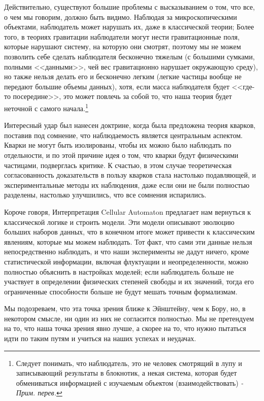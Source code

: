 \documentclass[main.tex]{subfiles}
\begin{document}
Действительно, существуют большие проблемы с высказыванием о том, что все, о чем мы говорим, должно быть видимо. Наблюдая за микроскопическими объектами, наблюдатель может нарушать их, даже в классической теории; Более того, в теориях гравитации наблюдатели могут нести гравитационные поля, которые нарушают систему, на которую они смотрят, поэтому мы не можем позволить себе сделать наблюдателя бесконечно тяжелым (с большими сумками, полными <<данными>>, чей вес гравитационно нарушает окружающую среду), но также нельзя делать его и бесконечно легким (легкие частицы вообще не передают большие объемы данных), хотя, если масса наблюдателя будет <<где-то посередине>>, это может повлечь за собой то, что наша теория будет неточной с самого начала.\footnote{Следует понимать, что наблюдатель, это не человек смотрящий в лупу и записывающий результаты в блокнотик, а некая система, которая будет обмениваться информацией с изучаемым объектом (взаимодействовать)\textit{ - Прим. перев.}}

Интересный удар был нанесен доктрине, когда была предложена теория кварков, поставив под сомнение, что наблюдаемость является центральным аспектом. Кварки не могут быть изолированы, чтобы их можно было наблюдать по отдельности, и по этой причине идея о том, что кварки будут физическими частицами, подверглась критике. К счастью, в этом случае теоретическая согласованность доказательств в пользу кварков стала настолько подавляющей, и экспериментальные методы их наблюдения, даже если они не были полностью разделены, настолько улучшились, что все сомнения испарились.

Короче говоря, Интерпретация Cellular Automaton предлагает нам вернуться к классической логике и строить модели. Эти модели описывают эволюцию больших наборов данных, что в конечном итоге может привести к классическим явлениям, которые мы можем наблюдать. Тот факт, что сами эти данные нельзя непосредственно наблюдать, и что наши эксперименты не дадут ничего, кроме статистической информации, включая флуктуации и неопределенности, можно полностью объяснить в настройках моделей; если наблюдатель больше не участвует в определении физических степеней свободы и их значений, тогда его ограниченные способности больше не будут мешать точным формализмам.

Мы подозреваем, что эта точка зрения ближе к Эйнштейну, чем к Бору, но, в некотором смысле, ни один из них не согласится полностью. Мы не претендуем на то, что наша точка зрения явно лучше, а скорее на то, что нужно пытаться идти по таким путям и учиться на наших успехах и неудачах.
\end{document}
